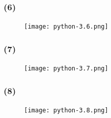 \documentclass{beamer}
\begin{document}
  \begin{frame}[fragile]
    \frametitle{(6)}
    \begin{figure}[!htb] %
      \texttt{[image: python-3.6.png]} %
    \end{figure}
  \end{frame}
  \begin{frame}[fragile]
    \frametitle{(7)}
    \begin{figure}[!htb] %
      \texttt{[image: python-3.7.png]} %
    \end{figure}
  \end{frame}
  \begin{frame}[fragile]
    \frametitle{(8)}
    \begin{figure}[!htb] %
      \texttt{[image: python-3.8.png]} %
    \end{figure}
  \end{frame}
\end{document}
